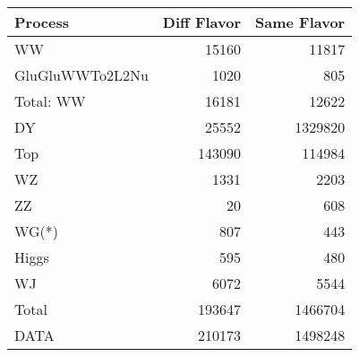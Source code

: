 \begin{table}[ht]
	\centering
\begin{tabular}{lrr}

         Process &  Diff Flavor &  Same Flavor \\
		\hline
              WW &        15160 &        11817 \\
 GluGluWWTo2L2Nu &         1020 &          805 \\
\hline
       Total: WW &        16181 &        12622 \\
              DY &        25552 &      1329820 \\
             Top &       143090 &       114984 \\
              WZ &         1331 &         2203 \\
              ZZ &           20 &          608 \\
           WG(*) &          807 &          443 \\
           Higgs &          595 &          480 \\
              WJ &         6072 &         5544 \\
\hline
           Total &       193647 &      1466704 \\
            DATA &       210173 &      1498248 \\


\end{tabular}

\end{table}